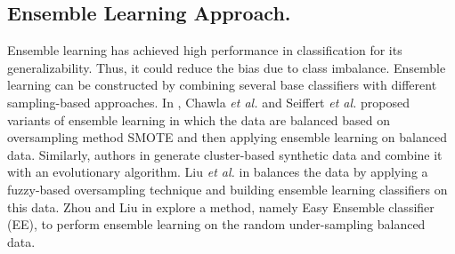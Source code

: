 \subsection{Ensemble Learning Approach.}
Ensemble learning has achieved high performance in classification for its generalizability. Thus, it could reduce the bias due to class imbalance. Ensemble learning can be constructed by combining several base classifiers with different sampling-based approaches. In \cite{SMOTEBoost, RUSBoost}, Chawla \textit{et al.} and Seiffert \textit{et al.} proposed variants of ensemble learning in which the data are balanced based on oversampling method SMOTE and then applying ensemble learning on balanced data. Similarly, authors in \cite{ECOEnsemble} generate cluster-based synthetic data and combine it with an evolutionary algorithm. Liu \textit{et al.} in \cite{LIU201735} balances the data by applying a fuzzy-based oversampling technique and building ensemble learning classifiers on this data. Zhou and Liu in \cite{EE} explore a method, namely Easy Ensemble classifier (EE), to perform ensemble learning on the random under-sampling balanced data.
     
